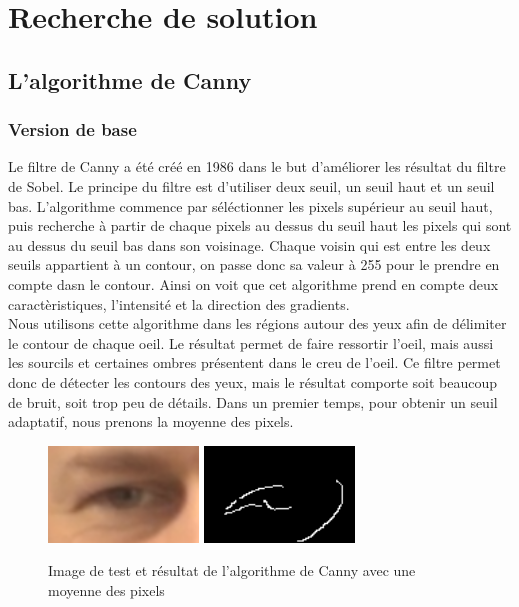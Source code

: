 \section{Recherche de solution}

\subsection{L'algorithme de Canny}

\subsubsection{Version de base}
Le filtre de Canny a été créé en 1986 dans le but d'améliorer les résultat du filtre de Sobel.
Le principe du filtre est d'utiliser deux seuil, un seuil haut et un seuil bas. L'algorithme
commence par séléctionner les pixels supérieur au seuil haut, puis recherche à partir de chaque
pixels au dessus du seuil haut les pixels qui sont au dessus du seuil bas dans son voisinage. 
Chaque voisin qui est entre les deux seuils appartient à un contour, on passe donc sa valeur à
255 pour le prendre en compte dasn le contour. Ainsi on voit 
que cet algorithme prend en compte deux caractèristiques, l'intensité et la direction des 
gradients.\\

Nous utilisons cette algorithme dans les régions autour des yeux afin de délimiter le contour
de chaque oeil. Le résultat permet de faire ressortir l'oeil, mais aussi les sourcils et certaines
ombres présentent dans le creu de l'oeil. Ce filtre permet donc de détecter les contours des yeux,
mais le résultat comporte soit beaucoup de bruit, soit trop peu de détails. Dans un premier
temps, pour obtenir un seuil adaptatif, nous prenons la moyenne des pixels.

\begin{figure}[H]
 \center
 \includegraphics[width=4cm]{image/original.png}
 \includegraphics[width=4cm]{image/canny_moyenne.png}
 \caption{Image de test et résultat de l'algorithme de Canny avec une moyenne des pixels}
\end{figure}

